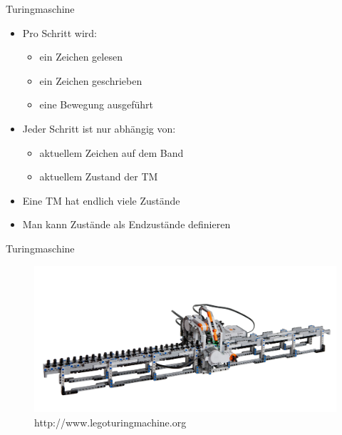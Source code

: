 \documentclass[ignorenonframetext,]{beamer}
\begin{document}
\begin{frame}{Turingmaschine}

\begin{itemize}
\itemsep1pt\parskip0pt
\item
  Pro Schritt wird:

  \begin{itemize}
  \itemsep1pt\parskip0pt
  \item
    ein Zeichen gelesen
  \item
    ein Zeichen geschrieben
  \item
    eine Bewegung ausgeführt
  \end{itemize}
\item
  Jeder Schritt ist nur abhängig von:

  \begin{itemize}
  \itemsep1pt\parskip0pt
  \item
    aktuellem Zeichen auf dem Band
  \item
    aktuellem Zustand der TM
  \end{itemize}
\item
  Eine TM hat endlich viele Zustände
\item
  Man kann Zustände als Endzustände definieren
\end{itemize}

\end{frame}

\begin{frame}{Turingmaschine}

\begin{figure}[htbp]
\centering
\includegraphics{img/lego_tm.png}
\caption{http://www.legoturingmachine.org}
\end{figure}

\end{frame}
\end{document}
